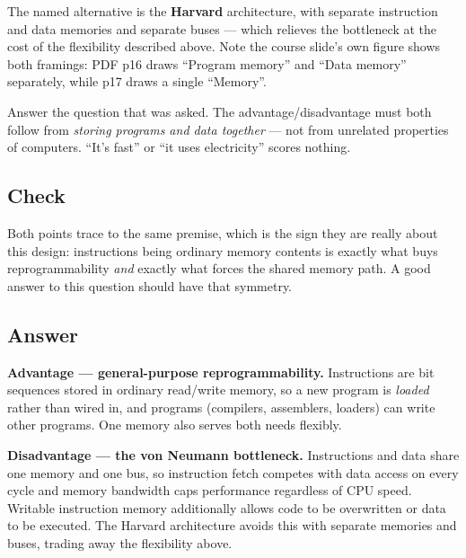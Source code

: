 The named alternative is the \textbf{Harvard} architecture, with separate
instruction and data memories and separate buses — which relieves the
bottleneck at the cost of the flexibility described above. Note the course
slide's own figure shows both framings: PDF p16 draws ``Program memory'' and
``Data memory'' separately, while p17 draws a single ``Memory''.

\begin{trap}
Answer the question that was asked. The advantage/disadvantage must both follow
from \emph{storing programs and data together} — not from unrelated properties
of computers. ``It's fast'' or ``it uses electricity'' scores nothing.
\end{trap}

\subsection*{Check}

Both points trace to the same premise, which is the sign they are really about
this design: instructions being ordinary memory contents is exactly what buys
reprogrammability \emph{and} exactly what forces the shared memory path. A good
answer to this question should have that symmetry.

\subsection*{Answer}

\begin{answerbox}
\textbf{Advantage — general-purpose reprogrammability.} Instructions are bit
sequences stored in ordinary read/write memory, so a new program is \emph{loaded}
rather than wired in, and programs (compilers, assemblers, loaders) can write
other programs. One memory also serves both needs flexibly.

\medskip
\textbf{Disadvantage — the von Neumann bottleneck.} Instructions and data share
one memory and one bus, so instruction fetch competes with data access on every
cycle and memory bandwidth caps performance regardless of CPU speed. Writable
instruction memory additionally allows code to be overwritten or data to be
executed. The Harvard architecture avoids this with separate memories and buses,
trading away the flexibility above.
\end{answerbox}


